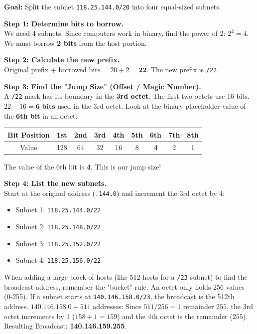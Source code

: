 \documentclass[11pt, letterpaper]{article}
\begin{document}
\vspace{8pt}
\begin{tcolorbox}[colback=partbg, colframe=sectionblue,
  title={\bfseries Worked Example 2: Splitting a Subnet (Borrowing Bits \& "Magic Number")}, arc=3pt, boxrule=1pt]
\textbf{Goal:} Split the subnet \texttt{118.25.144.0/20} into four equal-sized subnets.

\textbf{Step 1: Determine bits to borrow.}\\
We need 4 subnets. Since computers work in binary, find the power of 2: $2^2 = 4$.
We must borrow \textbf{2 bits} from the host portion.

\textbf{Step 2: Calculate the new prefix.}\\
Original prefix + borrowed bits = $20 + 2 = \mathbf{22}$. The new prefix is \texttt{/22}.

\textbf{Step 3: Find the "Jump Size" (Offset / Magic Number).}\\
A \texttt{/22} mask has its boundary in the \textbf{3rd octet}.
The first two octets use 16 bits. $22 - 16 = \textbf{6 bits}$ used in the 3rd octet.
Look at the binary placeholder value of the \textbf{6th bit} in an octet:
\begin{center}
\begin{tabular}{|c|c|c|c|c|c|c|c|c|}
\hline
Bit Position & 1st & 2nd & 3rd & 4th & 5th & \textbf{6th} & 7th & 8th \\ \hline
Value & 128 & 64 & 32 & 16 & 8 & \textbf{4} & 2 & 1 \\ \hline
\end{tabular}
\end{center}
The value of the 6th bit is \textbf{4}. This is our jump size!

\textbf{Step 4: List the new subnets.}\\
Start at the original address (\texttt{.144.0}) and increment the 3rd octet by 4:
\begin{itemize}[noitemsep]
  \item Subnet 1: \texttt{118.25.144.0/22}
  \item Subnet 2: \texttt{118.25.148.0/22}
  \item Subnet 3: \texttt{118.25.152.0/22}
  \item Subnet 4: \texttt{118.25.156.0/22}
\end{itemize}
\end{tcolorbox}

\begin{tcolorbox}[colback=notebg, colframe=noteborder, arc=3pt, boxrule=1pt, title={\bfseries Spanning Across Octets}]
When adding a large block of hosts (like 512 hosts for a \texttt{/23} subnet) to find the broadcast address, remember the "bucket" rule. An octet only holds 256 values (0-255).
If a subnet starts at \texttt{140.146.158.0/23}, the broadcast is the 512th address.
$140.146.158.0 + 511$ addresses:
Since $511 / 256 = 1$ remainder $255$, the 3rd octet increments by 1 ($158+1=159$) and the 4th octet is the remainder ($255$).
Resulting Broadcast: \textbf{140.146.159.255}.
\end{tcolorbox}
\end{document}
